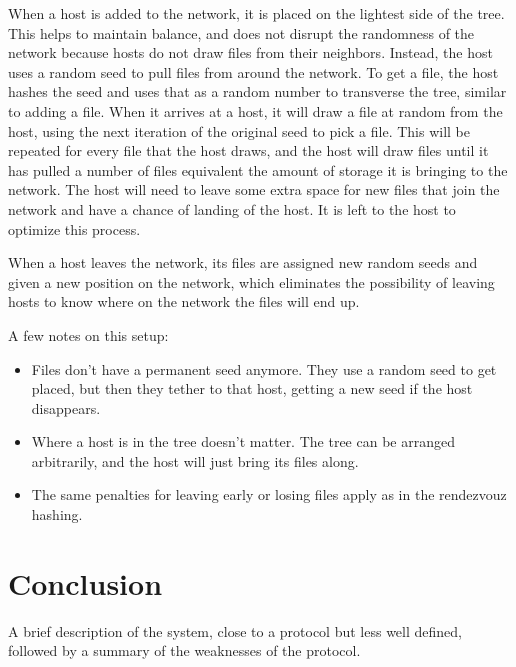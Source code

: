 \documentclass[twocolumn]{article}
\begin{document}
When a host is added to the network, it is placed on the lightest side of the tree.
This helps to maintain balance, and does not disrupt the randomness of the network because hosts do not draw files from their neighbors.
Instead, the host uses a random seed to pull files from around the network.
To get a file, the host hashes the seed and uses that as a random number to transverse the tree, similar to adding a file.
When it arrives at a host, it will draw a file at random from the host, using the next iteration of the original seed to pick a file.
This will be repeated for every file that the host draws, and the host will draw files until it has pulled a number of files equivalent the amount of storage it is bringing to the network.
The host will need to leave some extra space for new files that join the network and have a chance of landing of the host.
It is left to the host to optimize this process.

When a host leaves the network, its files are assigned new random seeds and given a new position on the network, which eliminates the possibility of leaving hosts to know where on the network the files will end up.

A few notes on this setup:
\begin{itemize}
	\item Files don't have a permanent seed anymore. They use a random seed to get placed, but then they tether to that host, getting a new seed if the host disappears.
	\item Where a host is in the tree doesn't matter. The tree can be arranged arbitrarily, and the host will just bring its files along.
	\item The same penalties for leaving early or losing files apply as in the rendezvouz hashing.
\end{itemize}

\section{Conclusion}
A brief description of the system, close to a protocol but less well defined, followed by a summary of the weaknesses of the protocol.
\end{document}
